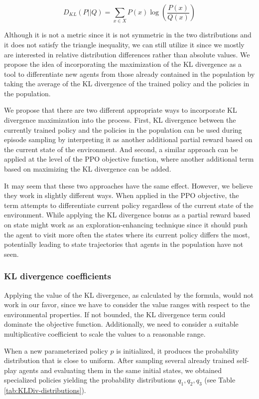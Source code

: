 \[
    D_{KL}(P||Q) = \sum_{x \in X}P(x)\log\left(\frac{P(x)}{Q(x)}\right)
\]

Although it is not a metric since it is not symmetric in the two distributions and it does not satisfy the triangle inequality, we can still utilize it since we mostly are interested in relative distribution differences rather than absolute values.
We propose the idea of incorporating the maximization of the KL divergence as a tool to differentiate new agents from those already contained in the population by taking the average of the KL divergence of the trained policy and the policies in the population.

We propose that there are two different appropriate ways to incorporate KL divergence maximization into the process.
First, KL divergence between the currently trained policy and the policies in the population can be used during episode sampling by interpreting it as another additional partial reward based on the current state of the environment.
And second, a similar approach can be applied at the level of the PPO objective function, where another additional term based on maximizing the KL divergence can be added.

It may seem that these two approaches have the same effect.
However, we believe they work in slightly different ways.
When applied in the PPO objective, the term attempts to differentiate current policy regardless of the current state of the environment.
While applying the KL divergence bonus as a partial reward based on state might work as an exploration-enhancing technique since it should push the agent to visit more often the states where its current policy differs the most, potentially leading to state trajectories that agents in the population have not seen.

\subsubsection{KL divergence coefficients}
Applying the value of the KL divergence, as calculated by the formula, would not work in our favor, since we have to consider the value ranges with respect to the environmental properties.
If not bounded, the KL divergence term could dominate the objective function.
Additionally, we need to consider a suitable multiplicative coefficient to scale the values to a reasonable range.

When a new parameterized policy $p$ is initialized, it produces the probability distribution that is close to uniform.
After sampling several already trained self-play agents and evaluating them in the same initial states, we obtained specialized policies yielding the probability distributions $q_1, q_2, q_3$ (see Table \ref{tab:KLDiv-distributions}).


